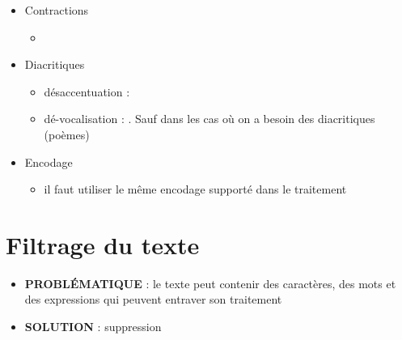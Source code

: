 \documentclass{KodeBook}
\begin{document}
\begin{itemize}
	
	\item Contractions
	\begin{itemize}
		\item {}
	\end{itemize}
	
	\item Diacritiques
	\begin{itemize}
		\item désaccentuation :  
		\item dé-vocalisation :  . Sauf dans les cas où on a besoin des diacritiques (poèmes)
	\end{itemize}
	
	\item Encodage 
	\begin{itemize}
		\item il faut utiliser le même encodage supporté dans le traitement
	\end{itemize}
	
\end{itemize}



\section{Filtrage du texte}

\begin{itemize}
	\item \textbf{PROBLÉMATIQUE} : le texte peut contenir des caractères, des mots et des expressions qui peuvent entraver son traitement
	\item \textbf{SOLUTION} : suppression
\end{itemize}
\end{document}
